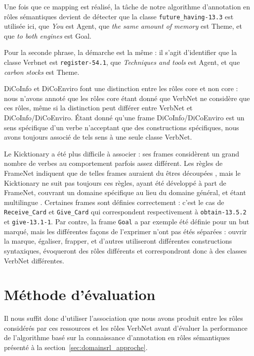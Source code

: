 Une fois que ce mapping est réalisé, la tâche de notre algorithme d'annotation
en rôles sémantiques devient de détecter que la classe \texttt{future\_having-13.3} est
utilisée ici, que \textit{You} est Agent, que \textit{the same amount of memory} est Theme,
et que \textit{to both engines} est Goal.

Pour la seconde phrase, la démarche est la même : il s'agit d'identifier que la
classe Verbnet est \texttt{register-54.1}, que \textit{Techniques and tools}
est Agent, et que \textit{carbon stocks} est Theme.

DiCoInfo et DiCoEnviro font une distinction entre les rôles core et non core :
nous n'avons annoté que les rôles core étant donné que VerbNet ne considère que
ces rôles, même si la distinction peut différer entre VerbNet et
DiCoInfo/DiCoEnviro. Étant donné qu'une frame DiCoInfo/DiCoEnviro est un sens
spécifique d'un verbe n'acceptant que des constructions spécifiques, nous avons
toujours associé de tels sens à une seule classe VerbNet.

Le Kicktionary a été plus difficile à associer : ses frames considèrent un
grand nombre de verbes au comportement parfois assez différent. Les règles de
FrameNet indiquent que de telles frames auraient du êtres découpées
\citep{ruppenhofer2006extended}, mais le Kicktionary ne suit pas toujours ces
règles, ayant été développé à part de FrameNet, couvrant un domaine spécifique
au lieu du domaine général, et étant multilingue
\citep{schmidt2006interfacing}. Certaines frames sont définies correctement :
c'est le cas de \texttt{Receive\_Card} et \texttt{Give\_Card} qui correspondent
respectivement à \texttt{obtain-13.5.2} et \texttt{give-13.1-1}. Par contre, la
frame \texttt{Goal} a par exemple été définie pour un but marqué, mais les
différentes façons de l'exprimer n'ont pas étés séparées : ouvrir la marque,
égaliser, frapper, et d'autres utiliseront différentes constructions
syntaxiques, évoqueront des rôles différents et correspondront donc à des
classes VerbNet différentes.

\section{Méthode d'évaluation}

Il nous suffit donc d'utiliser l'association que nous avons produit entre les
rôles considérés par ces ressources et les rôles VerbNet avant d'évaluer la
performance de l'algorithme basé sur la connaissance d'annotation en rôles
sémantiques présenté à la section~\ref{sec:domainsrl_approche}.

